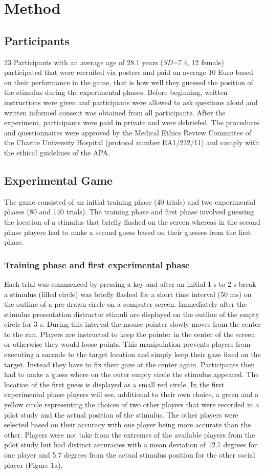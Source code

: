 \documentclass[jou]{apa}
\begin{document}
\section{Method}
\subsection{Participants}
23 Participants with an average age of 28.1 years (\textit{SD}=7.4, 12 female) participated that were recruited via posters and paid on average 10 Euro based on their performance in the game, that is how well they guessed the position of the stimulus during the experimental phases. Before beginning, written instructions were given and participants were allowed to ask questions aloud and written informed consent was obtained from all participants. After the experiment, participants were paid in private and were debriefed. The procedures and questionnaires were approved by the Medical Ethics Review Committee of the Charite University Hospital  (protocol number EA1/212/11) and comply with the ethical guidelines of the APA.

\subsection{Experimental Game}
The game consisted of an initial training phase (40 trials) and two experimental phases (80 and 140 trials). The training phase and first phase involved guessing the location of a stimulus that briefly flashed on the screen whereas in the second phase players had to make a second guess based on their guesses from the first phase. 

\subsubsection{Training phase and first experimental phase}
Each trial was commenced by pressing a key and after an initial 1 s to 2 s break a stimulus (filled circle) was briefly flashed for a short time interval (50 ms) on the outline of a pre-drawn circle on a computer screen. Immediately after the stimulus presentation distractor stimuli are displayed on the outline of the empty circle for 3 s. During this interval the mouse pointer slowly moves from the center to the rim. Players are instructed to keep the pointer in the center of the screen or otherwise they would loose points. This manipulation prevents players from executing a saccade to the target location and simply keep their gaze fixed on the target. Instead they have to fix their gaze at the center again. Participants then had to make a guess where on the outer empty circle the stimulus appeared. The location of the first guess is displayed as a small red circle. In the first experimental phase players will see, additional to their own choice, a green and a yellow circle representing the choices of two other players that were recorded in a pilot study and the actual position of the stimulus. The other players were selected based on their accuracy with one player being more accurate than the other. Players were not take from the extremes of the available players from the pilot study but had distinct accuracies with a mean deviation of 12.7 degrees for one player and 5.7 degrees from the actual stimulus position for the other social player (Figure 1a). 
\end{document}
